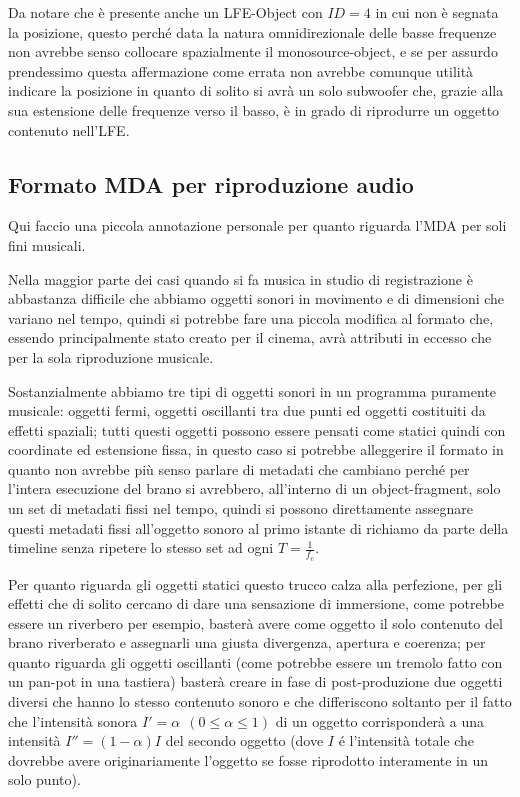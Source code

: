 \documentclass[12pt,a4paper]{report}
\begin{document}
Da notare che è presente anche un LFE-Object con $ID=4$ in cui non è segnata la posizione, questo perché data la natura omnidirezionale delle basse frequenze non avrebbe senso collocare spazialmente il monosource-object, e se per assurdo prendessimo questa affermazione come errata non avrebbe comunque utilità indicare la posizione in quanto di solito si avrà un solo subwoofer che, grazie alla sua estensione delle frequenze verso il basso, è in grado di riprodurre un oggetto contenuto nell'LFE.


\subsection{Formato MDA per riproduzione audio}

Qui faccio una piccola annotazione personale per quanto riguarda l'MDA per soli fini musicali.

Nella maggior parte dei casi quando si fa musica in studio di registrazione è abbastanza difficile che abbiamo oggetti sonori in movimento e di dimensioni che variano nel tempo, quindi si potrebbe fare una piccola modifica al formato che, essendo principalmente stato creato per il cinema, avrà attributi in eccesso che per la sola riproduzione musicale.

Sostanzialmente abbiamo tre tipi di oggetti sonori in un programma puramente musicale: oggetti fermi, oggetti oscillanti tra due punti ed oggetti costituiti da effetti spaziali; tutti questi oggetti possono essere pensati come statici quindi con coordinate ed estensione fissa, in questo caso si potrebbe alleggerire il formato in quanto non avrebbe più senso parlare di metadati che cambiano perché per l'intera esecuzione del brano si avrebbero, all'interno di un object-fragment, solo un set di metadati fissi nel tempo, quindi si possono direttamente assegnare questi metadati fissi all'oggetto sonoro al primo istante di richiamo da parte della  timeline senza ripetere lo stesso set ad ogni $T=\frac{1}{f_c}$.

Per quanto riguarda gli oggetti statici questo trucco calza alla perfezione, per gli effetti che di solito cercano di dare una sensazione di immersione, come potrebbe essere un riverbero per esempio, basterà avere come oggetto il solo contenuto del brano riverberato e assegnarli una giusta divergenza, apertura e coerenza; per quanto riguarda gli oggetti oscillanti (come potrebbe essere un tremolo fatto con un pan-pot in una tastiera) basterà creare in fase di post-produzione due oggetti diversi che hanno lo stesso contenuto sonoro e che differiscono soltanto per il fatto che l'intensità sonora $I'=\alpha \ \ (0\leq \alpha \leq 1)$ di un oggetto corrisponderà a una intensità $I''=(1-\alpha) I$ del secondo oggetto (dove $I$ é l'intensità totale che dovrebbe avere originariamente l'oggetto se fosse riprodotto interamente in un solo punto).
\end{document}
